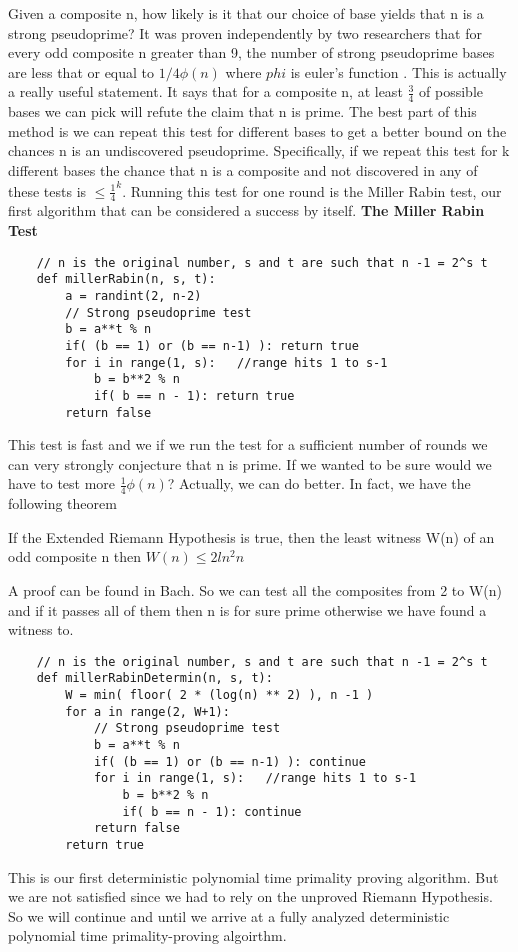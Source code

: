 \documentclass{article}
\begin{document}
Given a composite n, how likely is it that our choice of base yields that n is a strong pseudoprime?  It was proven independently by two researchers that for every odd composite n greater than 9, the number of strong pseudoprime bases are less that or equal to $ 1/4 \phi(n)$ where $phi$ is euler's function\cite{monier1980evaluation} \cite{rabin1980probabilistic}.
This is actually a really useful statement. It says that for a composite n, at least $\frac{3}{4}$ of possible bases we can pick will refute the claim that n is prime. The best part of this method is we can repeat this test for different bases to get a better bound on the chances n is an undiscovered pseudoprime. Specifically, if we repeat this test for k different bases the chance that n is a composite and not discovered in any of these tests is $\leq \frac{1}{4}^k$. Running this test for one round is the Miller Rabin test, our first algorithm that can be considered a success by itself. 
\textbf{The Miller Rabin Test}
\begin{verbatim}
    // n is the original number, s and t are such that n -1 = 2^s t
    def millerRabin(n, s, t):
        a = randint(2, n-2)
        // Strong pseudoprime test
        b = a**t % n
        if( (b == 1) or (b == n-1) ): return true
        for i in range(1, s):   //range hits 1 to s-1
            b = b**2 % n
            if( b == n - 1): return true
        return false
\end{verbatim}

This test is fast and we if we run the test for a sufficient number of rounds we can very strongly conjecture that n is prime. If we wanted to be sure would we have to test more $\frac{1}{4}\phi(n)$? Actually, we can do better.  In fact, we have the following theorem
\begin{theorem}
    If the Extended Riemann Hypothesis is true, then the least witness W(n) of an odd composite n then $W(n) \leq 2 ln^2 n$
\end{theorem}
A proof can be found in Bach\cite{bach1985analytic}. So we can test all the composites from 2 to W(n) and if it passes all of them then n is for sure prime otherwise we have found a witness to. 
\begin{verbatim}
    // n is the original number, s and t are such that n -1 = 2^s t
    def millerRabinDetermin(n, s, t):
        W = min( floor( 2 * (log(n) ** 2) ), n -1 )
        for a in range(2, W+1):
            // Strong pseudoprime test
            b = a**t % n
            if( (b == 1) or (b == n-1) ): continue
            for i in range(1, s):   //range hits 1 to s-1
                b = b**2 % n
                if( b == n - 1): continue
            return false
        return true
\end{verbatim}
This is our first deterministic polynomial time primality proving algorithm. But we are not satisfied since we had to rely on the unproved Riemann Hypothesis. So we will continue and until we arrive at a fully analyzed deterministic polynomial time primality-proving algoirthm. 
\end{document}
